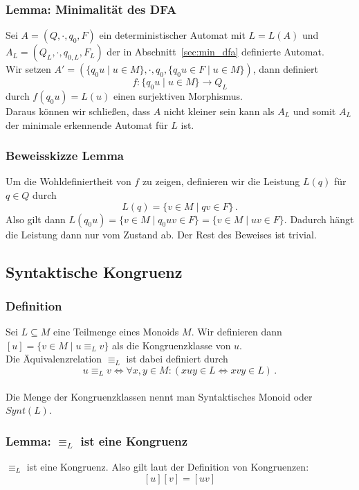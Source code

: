 \documentclass[12pt, german]{article}
\begin{document}
	\subsubsection{Lemma: Minimalität des DFA}
	Sei $A = (Q, \cdot, q_0, F)$ ein deterministischer Automat mit $L = L(A)$ und $A_L = (Q_L, \cdot, q_{0,L}, F_L)$ der in Abschnitt~\ref{sec:min_dfa} definierte Automat.  \\
	
	Wir setzen $A' = (\{q_0u \mid u \in M\}, \cdot, q_0, \{q_0u \in F \mid u \in M\})$, dann definiert $$f: \{q_0u \mid u \in M\} \to Q_L$$ durch $f(q_0u) = L(u)$ einen surjektiven Morphismus.\\
	Daraus können wir schlie\ss en, dass $A$ nicht kleiner sein kann als $A_L$ und somit $A_L$ der minimale erkennende Automat für $L$ ist.
	
	
	\subsubsection{Beweisskizze Lemma}
	Um die Wohldefiniertheit von $f$ zu zeigen, definieren wir die Leistung $L(q)$ für $q \in Q$ durch $$L(q) = \{v \in M \mid qv \in F\}\, .$$ Also gilt dann $L(q_0u) = \{v \in M \mid q_0uv \in F\} = \{v \in M \mid uv \in F\}$.
	Dadurch hängt die Leistung dann nur vom Zustand ab. 
	Der Rest des Beweises ist trivial.
	
	\subsection{Syntaktische Kongruenz}
	\subsubsection{Definition}
	Sei $L \subseteq M$ eine Teilmenge eines Monoids $M$. Wir definieren dann $[u] = \{v \in M \mid u \equiv_L v\}$ als die Kongruenzklasse von $u$.\\
	Die Äquivalenzrelation $\equiv_L$ ist dabei definiert durch $$ u \equiv_L v \iff \forall x,y \in M : (xuy \in L \iff xvy \in L)\, .$$
	\\
	Die Menge der Kongruenzklassen nennt man Syntaktisches Monoid oder $Synt(L)$.
	
	\subsubsection{Lemma: $\equiv_L$ ist eine Kongruenz}
	$\equiv_L$ ist eine Kongruenz. Also gilt laut der Definition von Kongruenzen: $$[u][v]=[uv]$$ 
	
\end{document}
